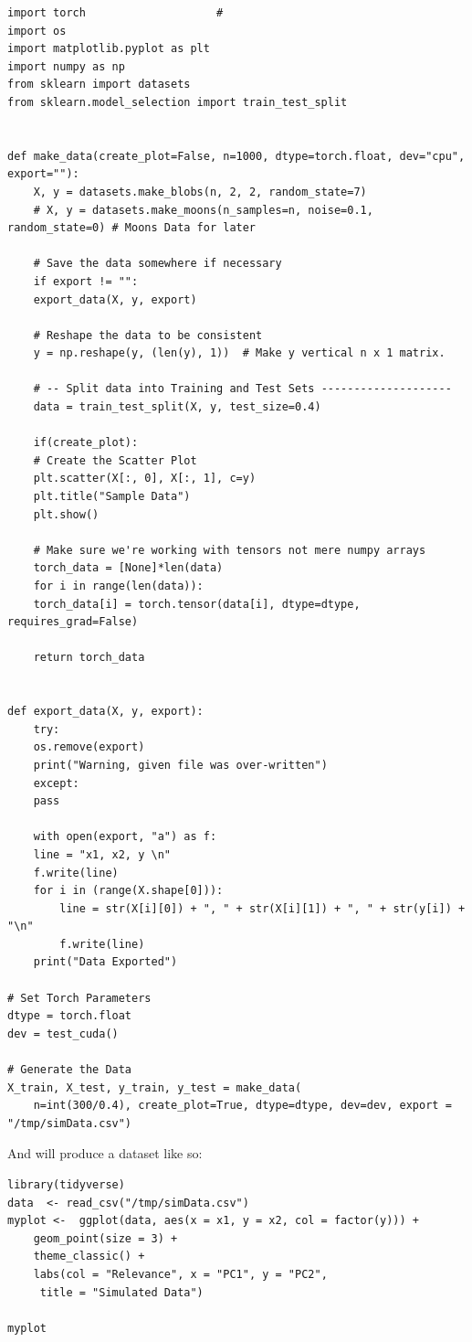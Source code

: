 \documentclass[a4paper,11pt,twoside]{article}
\begin{document}
\begin{verbatim}
import torch                    # 
import os
import matplotlib.pyplot as plt
import numpy as np
from sklearn import datasets
from sklearn.model_selection import train_test_split


def make_data(create_plot=False, n=1000, dtype=torch.float, dev="cpu", export=""):
    X, y = datasets.make_blobs(n, 2, 2, random_state=7)
    # X, y = datasets.make_moons(n_samples=n, noise=0.1, random_state=0) # Moons Data for later

    # Save the data somewhere if necessary
    if export != "":
	export_data(X, y, export)

    # Reshape the data to be consistent
    y = np.reshape(y, (len(y), 1))  # Make y vertical n x 1 matrix.

    # -- Split data into Training and Test Sets --------------------
    data = train_test_split(X, y, test_size=0.4)

    if(create_plot):
	# Create the Scatter Plot
	plt.scatter(X[:, 0], X[:, 1], c=y)
	plt.title("Sample Data")
	plt.show()

    # Make sure we're working with tensors not mere numpy arrays
    torch_data = [None]*len(data)
    for i in range(len(data)):
	torch_data[i] = torch.tensor(data[i], dtype=dtype, requires_grad=False)

    return torch_data


def export_data(X, y, export):
    try:
	os.remove(export)
	print("Warning, given file was over-written")
    except:
	pass

    with open(export, "a") as f:
	line = "x1, x2, y \n"
	f.write(line)
	for i in (range(X.shape[0])):
	    line = str(X[i][0]) + ", " + str(X[i][1]) + ", " + str(y[i]) + "\n"
	    f.write(line)
    print("Data Exported")

# Set Torch Parameters
dtype = torch.float
dev = test_cuda()

# Generate the Data
X_train, X_test, y_train, y_test = make_data(
    n=int(300/0.4), create_plot=True, dtype=dtype, dev=dev, export = "/tmp/simData.csv")
\end{verbatim}

And will produce a dataset like so:

\begin{verbatim}
library(tidyverse)
data  <- read_csv("/tmp/simData.csv")
myplot <-  ggplot(data, aes(x = x1, y = x2, col = factor(y))) +
    geom_point(size = 3) +
    theme_classic() +
    labs(col = "Relevance", x = "PC1", y = "PC2",
	 title = "Simulated Data")

myplot
\end{verbatim}
\end{document}
